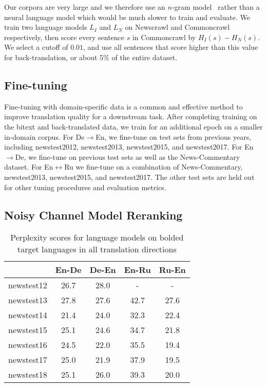 \documentclass[11pt,a4paper]{article}
\newcommand{\entode}{En$\rightarrow$De}
\newcommand{\detoen}{De$\rightarrow$En}
\newcommand{\enbiru}{En$\leftrightarrow$Ru}
\begin{document}
Our corpora are very large and we therefore use an $n$-gram model~\citep{kenneth2011kenlm} rather than a neural language model which would be much slower to train and evaluate.
We train two language models $L_I$ and $L_N$ on Newscrawl and Commoncrawl respectively, then score every sentence $s$ in Commoncrawl by $H_I(s) - H_N(s)$.
We select a cutoff of $0.01$, and use all sentences that score higher than this value for back-translation, or about 5\% of the entire dataset. 

\subsection{Fine-tuning}
Fine-tuning with domain-specific data is a common and effective method to improve translation quality for a downstream task. 
After completing training on the bitext and back-translated data, we train for an additional epoch on a smaller in-domain corpus.
For \detoen{}, we fine-tune on test sets from previous years, including newstest2012, newstest2013, newstest2015, and newstest2017.
For \entode{}, we fine-tune on previous test sets as well as the News-Commentary dataset.
For \enbiru{} we fine-tune on a combination of News-Commentary, newstest2013, newstest2015, and newstest2017. 
The other test sets are held out for other tuning procedures and evaluation metrics.

\subsection{Noisy Channel Model Reranking}

\begin{table}[t]
\centering
\begin{tabular}{lcccc}
\toprule
& En-\textbf{De} & De-\textbf{En} & En-\textbf{Ru} & Ru-\textbf{En} \\ \midrule
newstest12 & 26.7 & 28.0 & - & - \\
newstest13 & 27.8 & 27.6 & 42.7 & 27.6 \\
newstest14 & 21.4 & 24.0 & 32.3 & 22.4 \\
newstest15 & 25.1 & 24.6 & 34.7 & 21.8 \\
newstest16 & 24.5 & 22.0 & 35.5 & 19.4 \\
newstest17 & 25.0 & 21.9 & 37.9 & 19.5 \\
newstest18 & 25.1 & 26.0 & 39.3 & 20.0 \\
\bottomrule
\end{tabular}
\caption{Perplexity scores for language models on bolded target languages in all translation directions}
\label{tab:lm_newstest}
\end{table}
\end{document}
